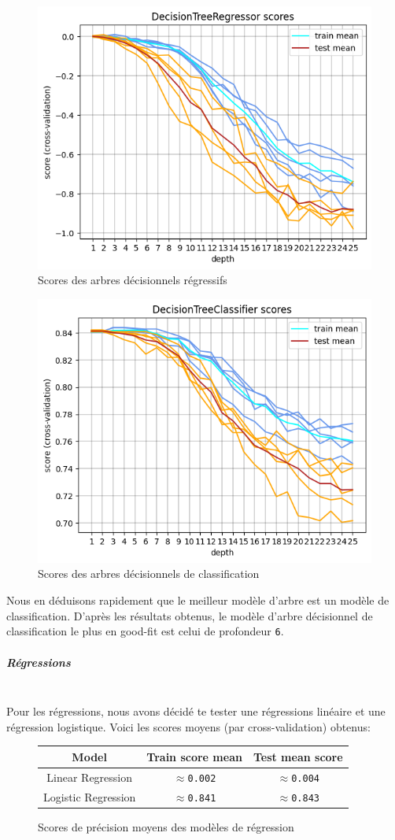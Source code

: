 \documentclass{article}
\begin{document}
\begin{figure}[H]
    \centering
    
    \caption{Scores des arbres décisionnels régressifs}
    \includegraphics[width=0.6\linewidth]{assets/regressor.decision_tree.scores.png}
\end{figure}
\begin{figure}[H]
    \centering
    
    \caption{Scores des arbres décisionnels de classification}
    \includegraphics[width=0.6\linewidth]{assets/classifier.decision_tree.scores.png}
\end{figure}

Nous en déduisons rapidement que le meilleur modèle d'arbre est un modèle de classification.
D'après les résultats obtenus, le modèle d'arbre décisionnel de classification le plus en good-fit est celui de profondeur \verb|6|.

\subparagraph{Régressions}
\ \\

Pour les régressions, nous avons décidé te tester une régressions linéaire et une régression logistique. Voici les scores moyens (par cross-validation) obtenus:

\begin{figure}[H]

\caption{Scores de précision moyens des modèles de régression}
\begin{center}
\begin{tabular}{|c|c|c|}
     \hline
     Model               & Train score mean & Test mean score \\
     \hline
     Linear Regression   & $\approx$\verb|0.002| & $\approx$\verb|0.004| \\
     Logistic Regression & $\approx$\verb|0.841| & $\approx$\verb|0.843| \\
     \hline
\end{tabular}
\end{center}

\end{figure}
\end{document}
